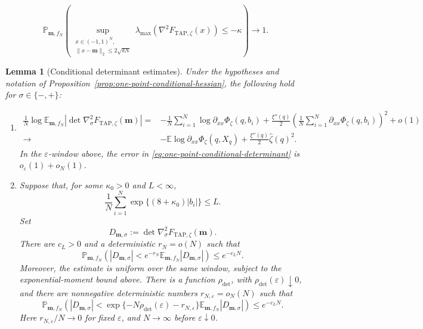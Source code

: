 \documentclass[10pt,a4paper]{amsart}
\newtheorem{lemma}{Lemma}
\newcommand{\TAP}{\mathrm{TAP}}
\newcommand{\bfm}{\mathbf{m}}
\newcommand{\dE}{\mathbb{E}}%
\newcommand{\dP}{\mathbb{P}}%
\newcommand{\ve}{\varepsilon}
\begin{document}
			\begin{equation}
				\dP_{\bfm,f_N}\left(
				\sup_{\substack{
						x\in(-1,1)^N,\\
						\|x-\bfm\|_2\le2\sqrt{\delta N}
				}}
				\lambda_{\max}\!\left(
				\nabla^2F_{\TAP,\zeta}(x)
				\right)
				\le-\kappa
				\right)\longrightarrow1.
			\end{equation}

	\begin{lemma}[Conditional determinant estimates]
		\label{lem:one-point-conditional-determinant}
		Under the hypotheses and notation of
		Proposition~\ref{prop:one-point-conditional-hessian}, the following
		hold for \(\sigma\in\{-,+\}\):
		\begin{enumerate}[label=\textup{(\roman*)}]
			\item
			\begin{equation}\label{eq:one-point-conditional-determinant}
				\begin{aligned}
					\frac1N
					\log\dE_{\bfm,f_N}
					\left|\det\nabla_\sigma^2F_{\TAP,\zeta}(\bfm)\right|
					={}&
					-\frac1N\sum_{i=1}^N
					\log\partial_{xx}\Phi_\zeta(q,b_i)
					+\frac{\xi''(q)}2
					\left(
					\frac1N\sum_{i=1}^N
					\partial_{xx}\Phi_\zeta(q,b_i)
					\right)^2
					+o(1)\\
					\longrightarrow{}&
					-\dE\log\partial_{xx}\Phi_\zeta(q,X_q)
					+\frac{\xi''(q)}2\widehat\zeta(q)^2 .
				\end{aligned}
			\end{equation}
			In the \(\ve\)-window above, the error in
			\eqref{eq:one-point-conditional-determinant} is
			\(o_\ve(1)+o_N(1)\).
			
			\item
			Suppose that, for some \(\kappa_0>0\) and \(L<\infty\),
			\[
			\frac1N\sum_{i=1}^N
			\exp\{(8+\kappa_0)|b_i|\}\le L.
			\]
			Set
			\[
			D_{\bfm,\sigma}
			:=
			\det\nabla_\sigma^2F_{\TAP,\zeta}(\bfm).
			\]
			There are \(c_L>0\) and a deterministic \(r_N=o(N)\) such that
			\begin{equation}\label{eq:one-point-determinant-lower-tail}
				\dP_{\bfm,f_N}\left(
				|D_{\bfm,\sigma}|
				<e^{-r_N}\dE_{\bfm,f_N}|D_{\bfm,\sigma}|
				\right)
				\le e^{-c_LN}.
			\end{equation}
			Moreover, the estimate is uniform over the same window, subject to the
			exponential-moment bound above. There is a function \(\rho_{\det}\),
			with \(\rho_{\det}(\ve)\downarrow0\), and there are nonnegative
			deterministic numbers \(r_{N,\ve}=o_N(N)\) such that
			\begin{equation}\label{eq:susy-one-point-determinant-lower-tail}
				\dP_{\bfm,f_N}\left(
				|D_{\bfm,\sigma}|
				<
				\exp\{-N\rho_{\det}(\ve)-r_{N,\ve}\}
				\dE_{\bfm,f_N}|D_{\bfm,\sigma}|
				\right)
				\le e^{-c_LN}.
			\end{equation}
			Here \(r_{N,\ve}/N\to0\) for fixed \(\ve\), and \(N\to\infty\)
			before \(\ve\downarrow0\).
		\end{enumerate}
	\end{lemma}
\end{document}

